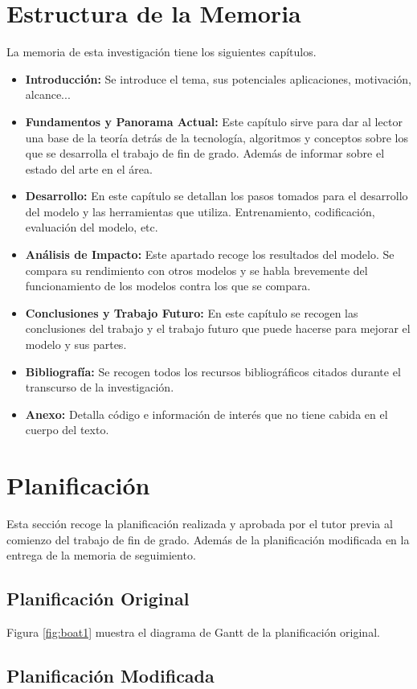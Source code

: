 \section{Estructura de la Memoria}
\label{sec:estructuramemoria}
La memoria de esta investigación tiene los siguientes capítulos.
\begin{itemize}
	\item \textbf{Introducción: } Se introduce el tema, sus potenciales aplicaciones, motivación, alcance... 
	\item \textbf{Fundamentos y Panorama Actual: } Este capítulo sirve para dar al lector una base de la teoría detrás de la tecnología, algoritmos y conceptos sobre los que se desarrolla el trabajo de fin de grado. Además de informar sobre el estado del arte en el área.
	\item \textbf{Desarrollo: } En este capítulo se detallan los pasos tomados para el desarrollo del modelo y las herramientas que utiliza. Entrenamiento, codificación, evaluación del modelo, etc. 
	\item \textbf{Análisis de Impacto: } Este apartado recoge los resultados del modelo. Se compara su rendimiento con otros modelos y se habla brevemente del funcionamiento de los modelos contra los que se compara.
	\item \textbf{Conclusiones y Trabajo Futuro: } En este capítulo se recogen las conclusiones del trabajo y el trabajo futuro que puede hacerse para mejorar el modelo y sus partes. 
	\item \textbf{Bibliografía: } Se recogen todos los recursos bibliográficos citados durante el transcurso de la investigación.
	\item \textbf{Anexo: } Detalla código e información de interés que no tiene cabida en el cuerpo del texto. 
\end{itemize}

\section{Planificación}
\label{sec:planificacion}
Esta sección recoge la planificación realizada y aprobada por el tutor previa al comienzo del trabajo de fin de grado. Además de la planificación modificada en la entrega de la memoria de seguimiento.
\subsection{Planificación Original}

Figura \ref{fig:boat1} muestra el diagrama de Gantt de la planificación original.

\subsection{Planificación Modificada}

